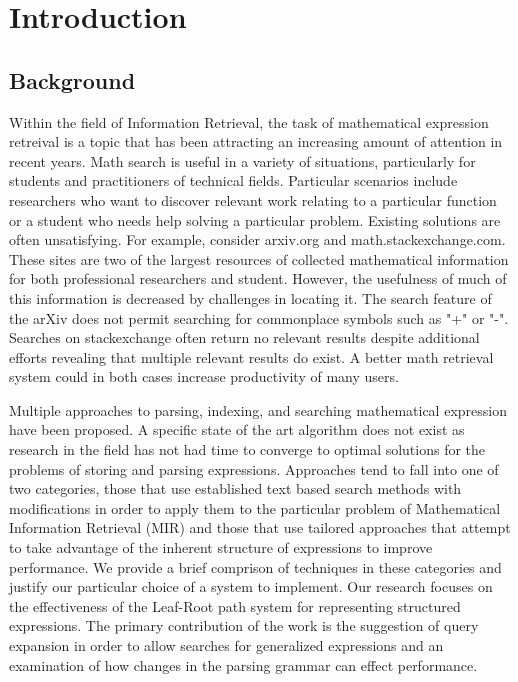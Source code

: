 \documentclass{sig-alternate}
\begin{document}



\section{Introduction}
\subsection{Background}
Within the field of Information Retrieval, the task of mathematical
expression retreival is a topic that has been attracting an increasing
amount of attention in recent years. Math search is useful in a variety
of situations, particularly for students and practitioners of technical
fields. Particular scenarios include researchers who want to discover
relevant work relating to a particular function or a student who needs
help solving a particular problem. Existing solutions are often
unsatisfying. For example, consider arxiv.org and math.stackexchange.com.
These sites are two of the largest resources of collected mathematical
information for both professional researchers and student. However, the
usefulness of much of this information is decreased by challenges in
locating it. The search feature of the arXiv does not permit searching for
commonplace symbols such as "+" or "-". Searches on stackexchange often
return no relevant results despite additional efforts revealing that multiple
relevant results do exist. A better math retrieval system could in both cases
increase productivity of many users.

Multiple approaches to parsing, indexing, and searching mathematical
expression have been proposed. A specific state of the art algorithm
does not exist as research in the field has not had time to converge
to optimal solutions for the problems of storing and parsing expressions.
Approaches tend to fall into one of two categories, those that use
established text based search methods with modifications in order
to apply them to the particular problem of Mathematical Information
Retrieval (MIR) and those that use tailored approaches that attempt
to take advantage of the inherent structure of expressions to improve
performance. We provide a brief comprison of techniques in these 
categories and justify our particular choice of a system to implement. 
Our research focuses on the effectiveness of the Leaf-Root path system
for representing structured expressions. The primary contribution of the
work is the suggestion of query expansion in order to allow searches for
generalized expressions and an examination of how changes in the 
parsing grammar can effect performance.
\end{document}
